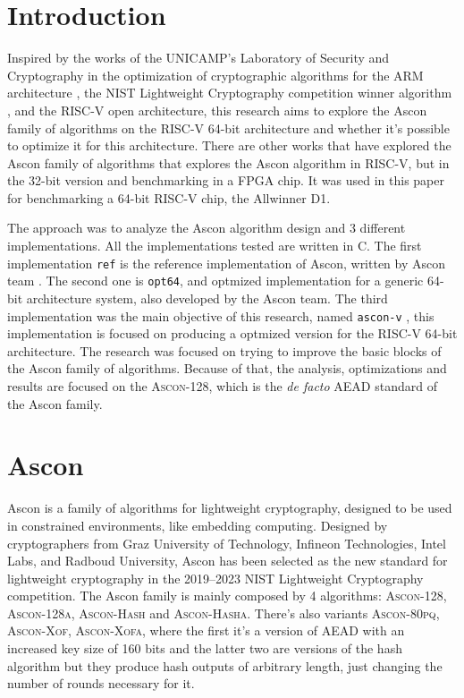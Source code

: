 \documentclass[11pt,twoside]{article}
\begin{document}
\section{Introduction}
Inspired by the works of the UNICAMP's Laboratory of Security and Cryptography in the optimization of cryptographic algorithms for the ARM architecture \cite{Fujii2017a}, the NIST Lightweight Cryptography competition winner algorithm \cite{turan2023status}, and the RISC-V open architecture, this research aims to explore the Ascon family of algorithms \cite{asconv12nist} on the RISC-V 64-bit architecture and whether it's possible to optimize it for this architecture. There are other works that have explored the Ascon family of algorithms \cite{jellema2019optimizing} that explores the Ascon algorithm in RISC-V, but in the 32-bit version and benchmarking in a FPGA chip. It was used in this paper for benchmarking a 64-bit RISC-V chip, the Allwinner D1.

The approach was to analyze the Ascon algorithm design and 3 different implementations. All the implementations tested are written in C. The first implementation \texttt{ref} is the reference implementation of Ascon, written by Ascon team \cite{asconc2023}. The second one is \texttt{opt64}, and optmized implementation for a generic 64-bit architecture system, also developed by the Ascon team. The  third implementation was the main objective of this research, named \texttt{ascon-v} \cite{asconv2023}, this implementation is focused on producing a optmized version for the RISC-V 64-bit architecture. The research was focused on trying to improve the basic blocks of the Ascon family of algorithms. Because of that, the analysis, optimizations and results are focused on the \textsc{Ascon-128}, which is the \textit{de facto} AEAD standard of the Ascon family.

\section{Ascon}

Ascon is a family of algorithms for lightweight cryptography, designed to be used in constrained environments, like embedding computing. Designed by cryptographers from Graz University of Technology, Infineon Technologies, Intel Labs, and Radboud University, Ascon has been selected as the new standard for lightweight cryptography in the 2019–2023 NIST Lightweight Cryptography competition. The Ascon family is mainly composed by 4 algorithms: \textsc{Ascon-128}, \textsc{Ascon-128a}, \textsc{Ascon-Hash} and \textsc{Ascon-Hasha}. There's also variants \textsc{Ascon-80pq}, \textsc{Ascon-Xof}, \textsc{Ascon-Xofa}, where the first it's a version of AEAD with an increased key size of 160 bits and the latter two are versions of the hash algorithm but they produce hash outputs of arbitrary length, just changing the number of rounds necessary for it.
\end{document}
